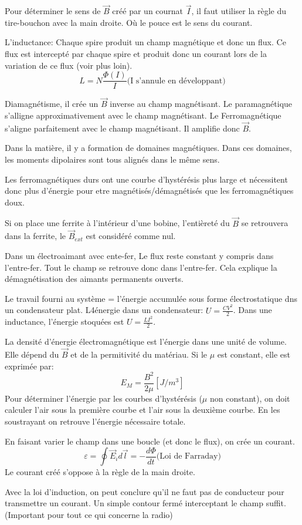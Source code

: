 \documentclass[11pt,a4paper]{article} %
\newcommand{\B}{\vec B}
\newcommand{\EMF}{\varepsilon}
\begin{document}
Pour déterminer le sens de $\B$ créé par un cournat $\vec I$, il faut utiliser la règle du tire-bouchon avec la main droite. Où le pouce est le sens du courant.

L'inductance: Chaque spire produit un champ magnétique et donc un flux. Ce flux est intercepté par chaque spire et produit donc un courant lors de la variation de ce flux (voir plus loin).
$$L = N\frac{\Phi(I)}{I} \textrm{(I s'annule en développant)}$$ 

Diamagnétisme, il crée un $\B$ inverse au champ magnétisant. Le paramagnétique s'alligne approximativement avec le champ magnétisant. Le Ferromagnétique s'aligne parfaitement avec le champ magnétisant. Il amplifie donc $\B$.

Dans la matière, il y a formation de domaines magnétiques. Dans ces domaines, les moments dipolaires sont tous alignés dans le même sens.

Les ferromagnétiques durs ont une courbe d'hystérésis plus large et nécessitent donc plus d'énergie pour etre magnétisés/démagnétisés que les ferromagnétiques doux.

Si on place une ferrite à l'intérieur d'une bobine, l'entièreté du $\B$ se retrouvera dans la ferrite, le $\B_{ext}$ est considéré comme nul.

Dans un électroaimant avec ente-fer, Le flux reste constant y compris dans l'entre-fer. Tout le champ se retrouve donc dans l'entre-fer. Cela explique la démagnétisation des aimants permanents ouverts.

Le travail fourni au système = l'énergie accumulée sous forme électrostatique dns un condensateur plat. L4énergie dans un condensateur: $U = \frac{CV^2}{2}$. Dans une inductance, l'énergie stoquées est $U = \frac{LI^2}{2}$.

La densité d'énergie électromagnétique est l'énergie dans une unité de volume. Elle dépend du $\B$ et de la permitivité du matériau. Si le $\mu$ est constant, elle est exprimée par:
$$E_M =  \frac{B^2}{2\mu} [J/m^3]$$
Pour déterminer l'énergie par les courbes d'hystérésis ($\mu$ non constant), on doit calculer l'air sous la première courbe et l'air sous la deuxième courbe. En les soustrayant on retrouve l'énergie nécessaire totale.

En faisant varier le champ dans une boucle (et donc le flux), on crée un courant.
$$\EMF = \oint \vec E_i d\vec l = -\frac{d\Phi}{dt} \textrm{(Loi de Farraday)}$$
Le courant créé s'oppose à la règle de la main droite.

Avec la loi d'induction, on peut conclure qu'il ne faut pas de conducteur pour transmettre un courant. Un simple contour fermé interceptant le champ suffit. (Important pour tout ce qui concerne la radio)
\end{document}
